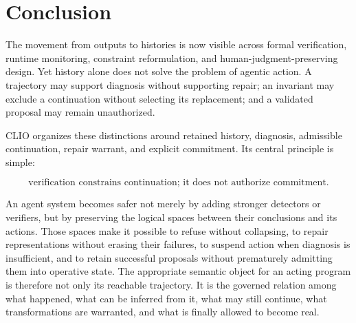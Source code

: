 \documentclass[11pt]{article}
\begin{document}
\section{Conclusion}

The movement from outputs to histories is now visible across formal verification, runtime monitoring, constraint reformulation, and human-judgment-preserving design. Yet history alone does not solve the problem of agentic action. A trajectory may support diagnosis without supporting repair; an invariant may exclude a continuation without selecting its replacement; and a validated proposal may remain unauthorized.

CLIO organizes these distinctions around retained history, diagnosis, admissible continuation, repair warrant, and explicit commitment. Its central principle is simple:

\begin{equation}
\text{verification constrains continuation; it does not authorize commitment.}
\end{equation}

An agent system becomes safer not merely by adding stronger detectors or verifiers, but by preserving the logical spaces between their conclusions and its actions. Those spaces make it possible to refuse without collapsing, to repair representations without erasing their failures, to suspend action when diagnosis is insufficient, and to retain successful proposals without prematurely admitting them into operative state. The appropriate semantic object for an acting program is therefore not only its reachable trajectory. It is the governed relation among what happened, what can be inferred from it, what may still continue, what transformations are warranted, and what is finally allowed to become real.

\newpage
\end{document}
